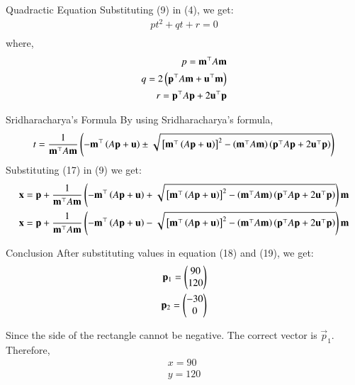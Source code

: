 \documentclass{beamer}
\begin{document}
\begin{frame}{Quadractic Equation}
Substituting (9) in (4), we get:
\begin{align}
    pt^2+qt+r=0\\
\end{align}
where,
\begin{align}
    p=\mathbf{m}^\top A\mathbf{m}\\
    q=2\left(\mathbf{p}^\top A\mathbf{m}+\mathbf{u}^\top\mathbf{m}\right)\\
    r=\mathbf{p}^\top A\mathbf{p}+2\mathbf{u}^\top\mathbf{p}
\end{align}
\end{frame}

\begin{frame}{Sridharacharya's Formula}
By using Sridharacharya's formula,
\begin{align}
    t=\frac{1}{\mathbf{m}^\top A\mathbf{m}}\left(-\mathbf{m}^\top\left(A\mathbf{p}+\mathbf{u}\right)\pm\sqrt{{}\left[\mathbf{m}^\top\left(A\mathbf{p}+\mathbf{u}\right)\right]^2-\left(\mathbf{m}^\top A\mathbf{m}\right)\left(\mathbf{p}^\top A\mathbf{p}+2\mathbf{u}^\top\mathbf{p}\right)}\right)
\end{align}
Substituting (17) in (9) we get:
\begin{align}
    \mathbf{x}= \mathbf{p}+\frac{1}{\mathbf{m}^\top A\mathbf{m}}\left(-\mathbf{m}^\top\left(A\mathbf{p}+\mathbf{u}\right)+\sqrt{{}\left[\mathbf{m}^\top\left(A\mathbf{p}+\mathbf{u}\right)\right]^2-\left(\mathbf{m}^\top A\mathbf{m}\right)\left(\mathbf{p}^\top A\mathbf{p}+2\mathbf{u}^\top\mathbf{p}\right)}\right)\mathbf{m}\\
    \mathbf{x}= \mathbf{p}+\frac{1}{\mathbf{m}^\top A\mathbf{m}}\left(-\mathbf{m}^\top\left(A\mathbf{p}+\mathbf{u}\right)-\sqrt{{}\left[\mathbf{m}^\top\left(A\mathbf{p}+\mathbf{u}\right)\right]^2-\left(\mathbf{m}^\top A\mathbf{m}\right)\left(\mathbf{p}^\top A\mathbf{p}+2\mathbf{u}^\top\mathbf{p}\right)}\right)\mathbf{m}
\end{align}
\end{frame}

\begin{frame}{Conclusion}
    After substituting values in equation (18) and (19), we get:
\begin{align}
    \mathbf{p}_1 = \begin{pmatrix}90\\120\end{pmatrix}\\
    \mathbf{p}_2 = \begin{pmatrix}-30\\0\end{pmatrix}
\end{align}

Since the side of the rectangle cannot be negative. The correct vector is $\vec{p}_1$.\\ Therefore,
\begin{align}
    x = 90\\
    y = 120
\end{align}
\end{frame}
\end{document}
